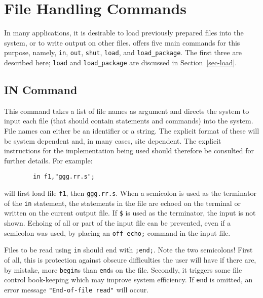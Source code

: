 \chapter{File Handling Commands}

In many applications, it is desirable to load previously prepared
{\REDUCE} files into the system, or to write output on other
files. {\REDUCE} offers five main commands for this purpose, namely,
\texttt{in}, \texttt{out}, \texttt{shut}, \texttt{load}, and
\texttt{load\_package}.  The first three are described here;
\texttt{load} and \texttt{load\_package} are discussed in
Section~\ref{sec-load}.

\section{IN Command}
\hypertarget{command:IN}{}
\hypertarget{switch:ECHO}{}
\hypertarget{reserved:__FILE__}{}
\hypertarget{reserved:__LINE__}{}
This command takes a list of file names as argument and directs the system
to input each file (that should contain {\REDUCE} statements
and commands) into the system.  File names can either be an identifier or
a string.  The explicit format of these will be system dependent and, in
many cases, site dependent.  The explicit instructions for the
implementation being used should therefore be consulted for further
details. For example:
\begin{verbatim}
        in f1,"ggg.rr.s";
\end{verbatim}
will first load file \texttt{f1}, then \texttt{ggg.rr.s}.  When a semicolon is
used as the terminator of the \texttt{in} statement, the statements in the file are
echoed on the terminal or written on the current output file.  If \texttt{\$}
 is used as the terminator, the input is not
shown.  Echoing of all or part of the input file can be prevented, even if
a semicolon was used, by placing an \texttt{off echo;} command
in the input file.

Files to be read using \texttt{in} should end with \texttt{;end;}.  Note the two
semicolons!  First of all, this is protection against obscure difficulties
the user will have if there are, by mistake, more \texttt{begin}s than
\texttt{end}s on the file.  Secondly, it triggers some file control book-keeping
which may improve system efficiency.  If \texttt{end} is omitted, an error
message \texttt{"End-of-file read"} will occur.

